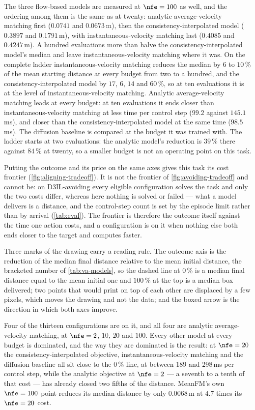 The three flow-based models are measured at $\nfe=100$ as well, and the ordering among them is the same as
at twenty: analytic average-velocity matching first ($0.0741$ and $0.0673$\,m), then the
consistency-interpolated model ($0.3897$ and $0.1791$\,m), with instantaneous-velocity matching last
($0.4085$ and $0.4247$\,m). A hundred evaluations more than halve the consistency-interpolated model's
median and leave instantaneous-velocity matching where it was. On the complete ladder
instantaneous-velocity matching reduces the median by $6$ to $10\,\%$ of the mean starting distance at every budget from two to a hundred,
and the consistency-interpolated model by $17$, $6$, $14$ and $60\,\%$, so at ten evaluations it is at the
level of instantaneous-velocity matching. Analytic average-velocity matching leads at every budget: at ten
evaluations it ends closer than instantaneous-velocity matching at less time per control step ($99.2$
against $145.1$\,ms), and closer than the consistency-interpolated model at the same time ($98.5$\,ms). The diffusion baseline is compared at the
budget it was trained with. The ladder starts at two evaluations: the analytic model's reduction is $39\,\%$
there against $84\,\%$ at twenty, so a smaller budget is not an operating point on this
task.

Putting the outcome and its price on the same axes gives this task its cost frontier
(\autoref{fig:aligning-tradeoff}). It is not the frontier of \autoref{fig:avoiding-tradeoff} and cannot
be: on D3IL-avoiding every eligible configuration solves the task and only the two costs differ, whereas
here nothing is solved or failed --- what a model delivers is a distance, and the control-step count is
set by the episode limit rather than by arrival (\autoref{tab:eval}). The frontier is therefore the
outcome itself against the time one action costs, and a configuration is on it when nothing else both
ends closer to the target and computes faster.

Three marks of the drawing carry a reading rule. The outcome axis is the reduction of the median final
distance relative to the mean initial distance, the bracketed number of \autoref{tab:va-models}, so the
dashed line at $0\,\%$ is a median final distance equal to the mean initial one and $100\,\%$ at the top is
a median box delivered; two points
that would print on top of each other are displaced by a few pixels, which moves the drawing and not the
data; and the boxed arrow is the direction in which both axes improve.

Four of the thirteen configurations are on it, and all four are analytic average-velocity matching, at
$\nfe=2$, $10$, $20$ and $100$. Every other model at every budget is dominated, and the way they are dominated
is the result: at $\nfe=20$ the consistency-interpolated objective, instantaneous-velocity matching and
the diffusion baseline all sit close to the $0\,\%$ line, at between $189$
and $298$\,ms per control step, while the analytic objective at $\nfe=2$ --- a seventh to a tenth of
that cost --- has already closed two fifths of the distance. MeanFM's own $\nfe=100$ point reduces its median distance
by only $0.0068$\,m at $4.7$ times its $\nfe=20$ cost.

